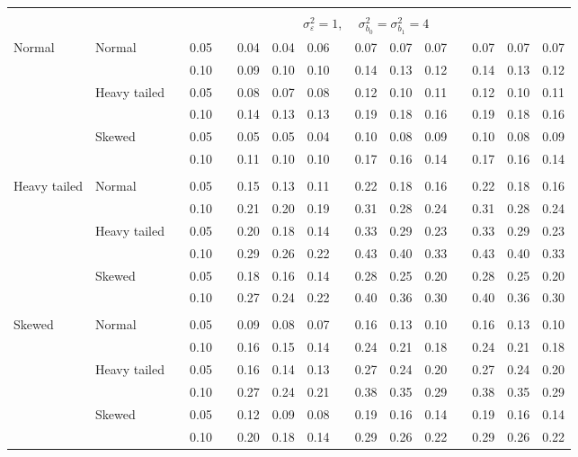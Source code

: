 \documentclass{article} %
\begin{document}
\begin{table}[ht]
\begin{scriptsize}
\begin{center}
\begin{tabular}{ll p{.1cm} c p{.1cm} rrr p{.1cm} rrr p{.1cm} rrr}
&&&&&&&&&&&&&&&\\
& && && \multicolumn{9}{c}{$\sigma_{\varepsilon}^2 = 1$, \ \ $\sigma_{b_0}^2 = \sigma_{b_1}^2 = 4$} \\ \cline{6-16}
Normal       & Normal       && 0.05 &&   0.04 & 0.04 & 0.06 && 0.07 & 0.07 & 0.07 && 0.07 & 0.07 & 0.07 \\ 
             &              && 0.10 &&   0.09 & 0.10 & 0.10 && 0.14 & 0.13 & 0.12 && 0.14 & 0.13 & 0.12 \\ 
             & Heavy tailed && 0.05 &&   0.08 & 0.07 & 0.08 && 0.12 & 0.10 & 0.11 && 0.12 & 0.10 & 0.11 \\ 
             &              && 0.10 &&   0.14 & 0.13 & 0.13 && 0.19 & 0.18 & 0.16 && 0.19 & 0.18 & 0.16 \\ 
             & Skewed       && 0.05 &&   0.05 & 0.05 & 0.04 && 0.10 & 0.08 & 0.09 && 0.10 & 0.08 & 0.09 \\ 
             &              && 0.10 &&   0.11 & 0.10 & 0.10 && 0.17 & 0.16 & 0.14 && 0.17 & 0.16 & 0.14 \\ 
             &&&&&&&&&&&&&&&\\
Heavy tailed & Normal       && 0.05 &&   0.15 & 0.13 & 0.11 && 0.22 & 0.18 & 0.16 && 0.22 & 0.18 & 0.16 \\ 
             &              && 0.10 &&   0.21 & 0.20 & 0.19 && 0.31 & 0.28 & 0.24 && 0.31 & 0.28 & 0.24 \\ 
             & Heavy tailed && 0.05 &&   0.20 & 0.18 & 0.14 && 0.33 & 0.29 & 0.23 && 0.33 & 0.29 & 0.23 \\ 
             &              && 0.10 &&   0.29 & 0.26 & 0.22 && 0.43 & 0.40 & 0.33 && 0.43 & 0.40 & 0.33 \\ 
             & Skewed       && 0.05 &&   0.18 & 0.16 & 0.14 && 0.28 & 0.25 & 0.20 && 0.28 & 0.25 & 0.20 \\ 
             &              && 0.10 &&   0.27 & 0.24 & 0.22 && 0.40 & 0.36 & 0.30 && 0.40 & 0.36 & 0.30 \\
             &&&&&&&&&&&&&&&\\ 
Skewed       & Normal       && 0.05 &&   0.09 & 0.08 & 0.07 && 0.16 & 0.13 & 0.10 && 0.16 & 0.13 & 0.10 \\ 
             &              && 0.10 &&   0.16 & 0.15 & 0.14 && 0.24 & 0.21 & 0.18 && 0.24 & 0.21 & 0.18 \\ 
             & Heavy tailed && 0.05 &&   0.16 & 0.14 & 0.13 && 0.27 & 0.24 & 0.20 && 0.27 & 0.24 & 0.20 \\ 
             &              && 0.10 &&   0.27 & 0.24 & 0.21 && 0.38 & 0.35 & 0.29 && 0.38 & 0.35 & 0.29 \\ 
             & Skewed       && 0.05 &&   0.12 & 0.09 & 0.08 && 0.19 & 0.16 & 0.14 && 0.19 & 0.16 & 0.14 \\ 
             &              && 0.10 &&   0.20 & 0.18 & 0.14 && 0.29 & 0.26 & 0.22 && 0.29 & 0.26 & 0.22 \\ 



\end{tabular}
\end{center}
\end{scriptsize}
\end{table}
\end{document}
